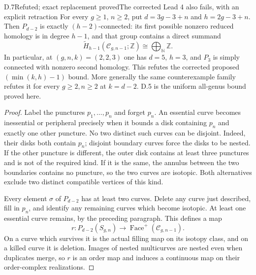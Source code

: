 \begin{result}{D.7}{Refuted; exact replacement proved}{The corrected Lead 4 also fails, with an explicit retraction}
For every $g\geq1$, $n\geq2$, put $d=3g-3+n$ and $h=2g-3+n$. Then $P_{d-2}$ is exactly $(h-2)$-connected: its first possible nonzero reduced homology is in degree $h-1$, and that group contains a direct summand
\[
 \widetilde H_{h-1}(\mathcal C_{g,n-1};\mathbb Z)
       \cong\bigoplus_{\mathbb N}\mathbb Z.
\]
In particular, at $(g,n,k)=(2,2,3)$ one has $d=5$, $h=3$, and $P_3$ is simply connected with nonzero second homology. This refutes the corrected proposed $(\min(k,h)-1)$ bound. More generally the same counterexample family refutes it for every $g\geq2,n\geq2$ at $k=d-2$. D.5 is the uniform all-genus bound proved here.
\end{result}
\begin{proof}
Label the punctures $p_1,\ldots,p_n$ and forget $p_n$. An essential curve becomes inessential or peripheral precisely when it bounds a disk containing $p_n$ and exactly one other puncture. No two distinct such curves can be disjoint. Indeed, their disks both contain $p_n$; disjoint boundary curves force the disks to be nested. If the other puncture is different, the outer disk contains at least three punctures and is not of the required kind. If it is the same, the annulus between the two boundaries contains no puncture, so the two curves are isotopic. Both alternatives exclude two distinct compatible vertices of this kind.

Every element $\sigma$ of $P_{d-2}$ has at least two curves. Delete any curve just described, fill in $p_n$, and identify any remaining curves which become isotopic. At least one essential curve remains, by the preceding paragraph. This defines a map
\[
 r:P_{d-2}(S_{g,n})\longrightarrow
       \operatorname{Face}^{+}(\mathcal C_{g,n-1}).
\]
On a curve which survives it is the actual filling map on its isotopy class, and on a killed curve it is deletion. Images of nested multicurves are nested even when duplicates merge, so $r$ is an order map and induces a continuous map on their order-complex realizations.


\end{proof}
